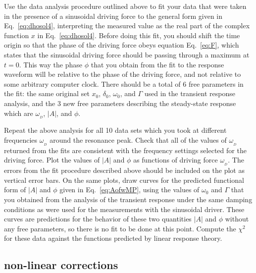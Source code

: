 \documentclass{revtex4}
\begin{document}
Use the data analysis procedure outlined above to fit your data that
were taken in the presence of a sinusoidal driving force to the general
form given in Eq.~\ref{eq:dhosol4}, interpreting the measured value as the
real part of the complex function $x$ in Eq.~\ref{eq:dhosol4}.  Before 
doing this fit, you should shift the time origin so that the phase of
the driving force obeys equation Eq.~\ref{eq:F}, which states that the
sinusoidal driving force should be passing through a maximum at $t=0$.
This way the phase $\phi$ that you obtain from the fit to the response
waveform will be relative to the phase of the driving force, and not
relative to some arbitrary computer clock.  There should be a total of
6 free parameters in the fit: the same original set $x_0$, $\delta_0$,
$\omega_0$, and $\Gamma$ used in the transient response analysis, and
the 3 new free parameters describing the steady-state response which
are $\omega_{_D}$, $|A|$, and $\phi$.

Repeat the above analysis for all 10 data sets which you took at different
frequencies $\omega_{_D}$ around the resonance peak.  Check that all of
the values of $\omega_{_D}$ returned from the fits are consistent with the
frequency settings selected for the driving force.  Plot the values of
$|A|$ and $\phi$ as functions of driving force $\omega_{_D}$.  The errors
from the fit procedure described above should be included on the plot as
vertical error bars.  On the same plots, draw curves for the predicted 
functional form of $|A|$ and $\phi$ given in Eq.~\ref{eq:AofwMP}, using
the values of $\omega_0$ and $\Gamma$ that you obtained from the analysis
of the transient response under the same damping conditions as were used
for the measurements with the sinusoidal driver.  These curves are 
predictions for the behavior of these two quantities $|A|$ and $\phi$
without any free parameters, so there is no fit to be done at this point.
Compute the $\chi^2$ for these data against the functions predicted by
linear response theory.

\subsection{non-linear corrections}
\end{document}
